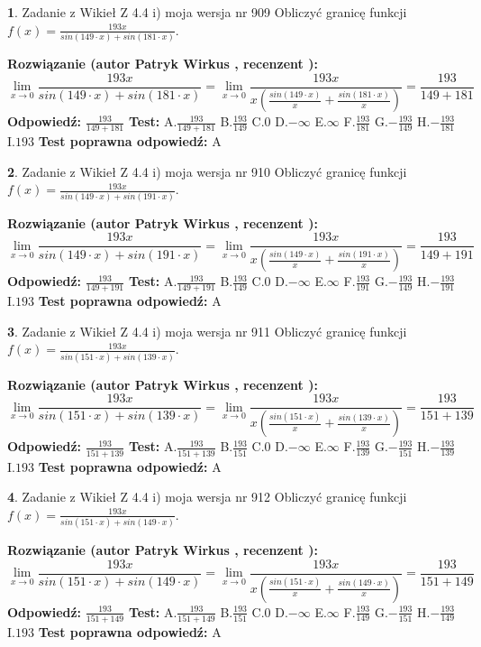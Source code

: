 \documentclass[12pt, a4paper]{article}
\theoremstyle{definition} %
\newtheorem{zad}{}
\newcommand{\zadStart}[1]{\begin{zad}#1\newline}
\newcommand{\zadStop}{\end{zad}}
\newcommand{\rozwStart}[2]{\noindent \textbf{Rozwiązanie (autor #1 , recenzent #2): }\newline}
\newcommand{\rozwStop}{\newline}
\newcommand{\odpStart}{\noindent \textbf{Odpowiedź:}\newline}
\newcommand{\odpStop}{\newline}
\newcommand{\testStart}{\noindent \textbf{Test:}\newline}
\newcommand{\testStop}{\newline}
\newcommand{\kluczStart}{\noindent \textbf{Test poprawna odpowiedź:}\newline}
\newcommand{\kluczStop}{\newline}
\begin{document}
\zadStart{Zadanie z Wikieł Z 4.4 i) moja wersja nr 909}
Obliczyć granicę funkcji $f(x)=\frac{193x}{sin(149\cdot x) +sin(181\cdot x)}$.
\zadStop
\rozwStart{Patryk Wirkus}{}
$$\lim\limits_{x\to 0}\frac{193x}{sin(149\cdot x) +sin(181\cdot x)}=\lim\limits_{x\to 0}\frac{193x}{x(\frac{sin(149\cdot x)}{x}+\frac{sin(181\cdot x)}{x})}=\frac{193}{149+181}$$
\rozwStop
\odpStart
$\frac{193}{149+181}$
\odpStop
\testStart
A.$\frac{193}{149+181}$
B.$\frac{193}{149}$
C.$0$
D.$-\infty$
E.$\infty$
F.$\frac{193}{181}$
G.$-\frac{193}{149}$
H.$-\frac{193}{181}$
I.$193$
\testStop
\kluczStart
A
\kluczStop



\zadStart{Zadanie z Wikieł Z 4.4 i) moja wersja nr 910}
Obliczyć granicę funkcji $f(x)=\frac{193x}{sin(149\cdot x) +sin(191\cdot x)}$.
\zadStop
\rozwStart{Patryk Wirkus}{}
$$\lim\limits_{x\to 0}\frac{193x}{sin(149\cdot x) +sin(191\cdot x)}=\lim\limits_{x\to 0}\frac{193x}{x(\frac{sin(149\cdot x)}{x}+\frac{sin(191\cdot x)}{x})}=\frac{193}{149+191}$$
\rozwStop
\odpStart
$\frac{193}{149+191}$
\odpStop
\testStart
A.$\frac{193}{149+191}$
B.$\frac{193}{149}$
C.$0$
D.$-\infty$
E.$\infty$
F.$\frac{193}{191}$
G.$-\frac{193}{149}$
H.$-\frac{193}{191}$
I.$193$
\testStop
\kluczStart
A
\kluczStop



\zadStart{Zadanie z Wikieł Z 4.4 i) moja wersja nr 911}
Obliczyć granicę funkcji $f(x)=\frac{193x}{sin(151\cdot x) +sin(139\cdot x)}$.
\zadStop
\rozwStart{Patryk Wirkus}{}
$$\lim\limits_{x\to 0}\frac{193x}{sin(151\cdot x) +sin(139\cdot x)}=\lim\limits_{x\to 0}\frac{193x}{x(\frac{sin(151\cdot x)}{x}+\frac{sin(139\cdot x)}{x})}=\frac{193}{151+139}$$
\rozwStop
\odpStart
$\frac{193}{151+139}$
\odpStop
\testStart
A.$\frac{193}{151+139}$
B.$\frac{193}{151}$
C.$0$
D.$-\infty$
E.$\infty$
F.$\frac{193}{139}$
G.$-\frac{193}{151}$
H.$-\frac{193}{139}$
I.$193$
\testStop
\kluczStart
A
\kluczStop



\zadStart{Zadanie z Wikieł Z 4.4 i) moja wersja nr 912}
Obliczyć granicę funkcji $f(x)=\frac{193x}{sin(151\cdot x) +sin(149\cdot x)}$.
\zadStop
\rozwStart{Patryk Wirkus}{}
$$\lim\limits_{x\to 0}\frac{193x}{sin(151\cdot x) +sin(149\cdot x)}=\lim\limits_{x\to 0}\frac{193x}{x(\frac{sin(151\cdot x)}{x}+\frac{sin(149\cdot x)}{x})}=\frac{193}{151+149}$$
\rozwStop
\odpStart
$\frac{193}{151+149}$
\odpStop
\testStart
A.$\frac{193}{151+149}$
B.$\frac{193}{151}$
C.$0$
D.$-\infty$
E.$\infty$
F.$\frac{193}{149}$
G.$-\frac{193}{151}$
H.$-\frac{193}{149}$
I.$193$
\testStop
\kluczStart
A
\kluczStop
\end{document}

